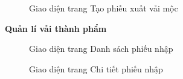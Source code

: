 \begin{figure}[H]
    \begin{center}
        \caption{Giao diện trang Tạo phiếu xuất vải mộc}
        \label{result_tao_phieu_xuat}
    \end{center}
\end{figure}

\textbf{Quản lí vải thành phẩm}

\begin{figure}[H]
    \begin{center}
        \caption{Giao diện trang Danh sách phiếu nhập}
        \label{result_danh_sach_phieu_nhap}
    \end{center}
\end{figure}

\begin{figure}[H]
    \begin{center}
        \caption{Giao diện trang Chi tiết phiếu nhập}
        \label{result_chi_tiet_phieu_nhap}
    \end{center}
\end{figure}

